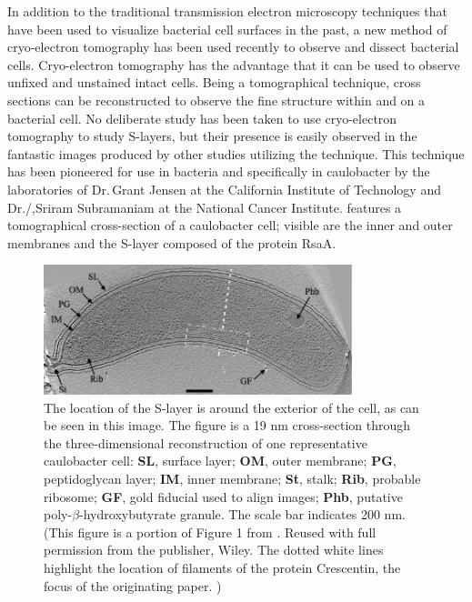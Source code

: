 In addition to the traditional transmission electron microscopy techniques that have been used to visualize bacterial cell surfaces in the past, a new method of cryo-electron
tomography has been used recently to observe and dissect bacterial cells. Cryo-electron tomography has the advantage that it can be used to observe unfixed and unstained intact
cells. Being a tomographical technique, cross sections can be reconstructed to observe the fine structure within and on a bacterial cell. No deliberate study has been taken to use
cryo-electron tomography to study \acp{S-layer}, but their presence is easily observed in the fantastic images produced by other studies utilizing the technique. This technique has
been pioneered for use in bacteria and specifically in \acl{caulobacter} by the
laboratories of Dr.\,Grant Jensen at the California Institute of Technology and
Dr./,Sriram Subramaniam at the National Cancer Institute. 
features a tomographical cross-section of a \ac{caulobacter} cell; visible are
the inner and outer membranes and the \ac{S-layer} composed of the protein RsaA.

\begin{figure}[htb]
  \begin{center}
    \includegraphics[width=0.8\textwidth]{intro/img/jensentomograph.jpg}
  \end{center}
  \caption[Electrotomograph of \ac{caulobacter}]{ The location of the \ac{S-layer} is around the exterior of the cell, as can be seen in this image. The figure is a 19
\si{\nano\meter} cross-section through the three-dimensional reconstruction of one representative \ac{caulobacter} cell: \textbf{SL}, surface layer; \textbf{OM}, outer membrane;
\textbf{PG}, peptidoglycan layer; \textbf{IM}, inner membrane; \textbf{St}, stalk; \textbf{Rib}, probable ribosome; \textbf{GF}, gold fiducial used to align images; \textbf{Phb},
putative poly-$\beta$-hydroxybutyrate granule. The scale bar indicates 200 \si{\nano\meter}. (This figure is a portion of Figure 1 from . Reused with full
permission from the publisher, Wiley. The dotted white lines highlight the location of filaments of the protein Crescentin, the focus of the originating paper. )}
  \label{fig:intro-tomo}
\end{figure}

